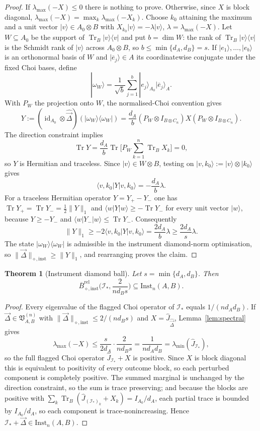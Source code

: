 \documentclass[11pt,a4paper]{article}
\newtheorem{theorem}{Theorem}[section]
\newcommand{\Inst}{\mathrm{Inst}}
\newcommand{\Tr}{\operatorname{Tr}}
\newcommand{\id}{\operatorname{id}}
\newcommand{\Jhat}{\widehat J}
\newcommand{\vD}{\vec{\Delta}}
\begin{document}
\begin{proof}
If $\lambda_{\max}(-X)\le0$ there is nothing to prove. Otherwise, since $X$ is block diagonal, $\lambda_{\max}(-X)=\max_k\lambda_{\max}(-X_k)$. Choose $k_0$ attaining the maximum and a unit vector $|v\rangle\in A_0\otimes B$ with $X_{k_0}|v\rangle=-\lambda|v\rangle$, $\lambda=\lambda_{\max}(-X)$. Let $W\subseteq A_0$ be the support of $\Tr_B|v\rangle\langle v|$ and put $b=\dim W$: the rank of $\Tr_B|v\rangle\langle v|$ is the Schmidt rank of $|v\rangle$ across $A_0\otimes B$, so $b\le\min\{d_A,d_B\}=s$. If $|e_1\rangle,\dots,|e_b\rangle$ is an orthonormal basis of $W$ and $|\overline e_j\rangle\in A$ its coordinatewise conjugate under the fixed Choi bases, define
\[
|\omega_W\rangle=\frac1{\sqrt b}\sum_{j=1}^b|e_j\rangle_{A_0}|\overline e_j\rangle_A.
\]
With $P_W$ the projection onto $W$, the normalised-Choi convention gives
\[
Y:=(\id_{A_0}\otimes\widehat{\vD})(|\omega_W\rangle\langle\omega_W|)
=\frac{d_A}{b}(P_W\otimes I_{B\otimes C_n})X(P_W\otimes I_{B\otimes C_n}).
\]
The direction constraint implies
\[
\Tr Y=\frac{d_A}{b}\Tr\Big[P_W\sum_{k=1}^n\Tr_BX_k\Big]=0,
\]
so $Y$ is Hermitian and traceless. Since $|v\rangle\in W\otimes B$, testing on $|v,k_0\rangle:=|v\rangle\otimes|k_0\rangle$ gives
\[
\langle v,k_0|Y|v,k_0\rangle=-\frac{d_A}{b}\lambda.
\]
For a traceless Hermitian operator $Y=Y_+-Y_-$ one has $\Tr Y_+=\Tr Y_-=\tfrac12\|Y\|_1$ and $\langle w|Y|w\rangle\ge-\Tr Y_-$ for every unit vector $|w\rangle$, because $Y\ge-Y_-$ and $\langle w|Y_-|w\rangle\le\Tr Y_-$. Consequently
\[
\|Y\|_1\ge-2\langle v,k_0|Y|v,k_0\rangle
=\frac{2d_A}{b}\lambda\ge\frac{2d_A}{s}\lambda.
\]
The state $|\omega_W\rangle\langle\omega_W|$ is admissible in the instrument diamond-norm optimisation, so $\|\vD\|_{\diamond,\mathrm{inst}}\ge\|Y\|_1$, and rearranging proves the claim.
\end{proof}

\begin{theorem}[Instrument diamond ball]
\label{thm:ball}
Let $s=\min\{d_A,d_B\}$. Then
\[
\overline B_{\diamond,\mathrm{inst}}^{\mathrm{rel}}\Big(\mathcal I_*,\frac{2}{nd_Bs}\Big)
\subseteq\Inst_n(A,B).
\]
\end{theorem}

\begin{proof}
Every eigenvalue of the flagged Choi operator of $\mathcal I_*$ equals $1/(nd_Ad_B)$. If $\vD\in\mathfrak V_{A,B}^{(n)}$ with $\|\vD\|_{\diamond,\mathrm{inst}}\le2/(nd_Bs)$ and $X=\Jhat_{\widehat{\vD}}$, Lemma~\ref{lem:spectral} gives
\[
\lambda_{\max}(-X)\le\frac{s}{2d_A}\cdot\frac{2}{nd_Bs}=\frac1{nd_Ad_B}=\lambda_{\min}(\Jhat_{\mathcal I_*}),
\]
so the full flagged Choi operator $\Jhat_{\mathcal I_*}+X$ is positive. Since $X$ is block diagonal this is equivalent to positivity of every outcome block, so each perturbed component is completely positive. The summed marginal is unchanged by the direction constraint, so the sum is trace preserving; and because the blocks are positive with $\sum_k\Tr_B(\Jhat_{(\mathcal I_*)_k}+X_k)=I_{A_0}/d_A$, each partial trace is bounded by $I_{A_0}/d_A$, so each component is trace-nonincreasing. Hence $\mathcal I_*+\vD\in\Inst_n(A,B)$.
\end{proof}
\end{document}
